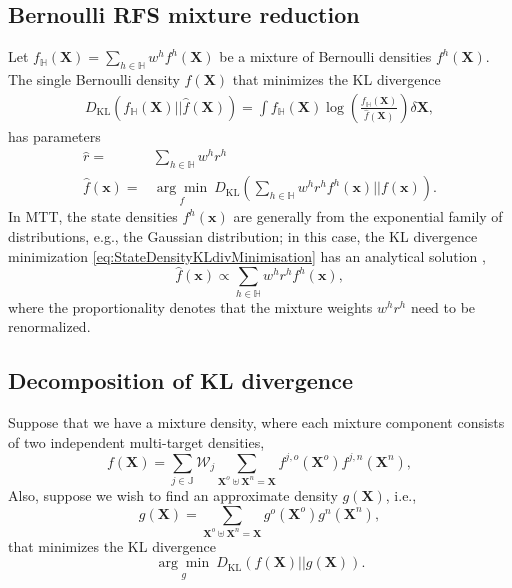\documentclass[journal]{IEEEtran}
\newcommand{\setX}{\mathbf{X}}
\newcommand{\sx}{\mathbf{x}}
\begin{document}
\subsection{Bernoulli RFS mixture reduction}
\label{sec:bmr}
Let $f_{\mathbb{H}}(\setX) = \sum_{h\in\mathbb{H}} w^{h} f^{h}(\setX)$ be a mixture of Bernoulli densities $f^{h}(\setX)$. The single Bernoulli density $\hat{f}(\setX)$ that minimizes the KL divergence
\begin{align}
    D_{\text{KL}}(f_{\mathbb{H}}(\setX) || \hat{f}(\setX) ) = \int f_{\mathbb{H}}(\setX) \log\left( \frac{f_{\mathbb{H}}(\setX)}{\hat{f}(\setX)} \right) \delta \setX,
\end{align}
has parameters \cite{pmbmpoint}
\begin{subequations}
\begin{align}
    \hat{r} = & \sum_{h\in\mathbb{H}} w^{h}r^{h} \\
    \hat{f}(\sx) = & \underset{f}{\arg\min}~D_{\text{KL}} \left(  \sum_{h\in\mathbb{H}} w^{h} r^{h} f^{h}(\sx)  || f(\sx) \right). \label{eq:StateDensityKLdivMinimisation}
\end{align}
\label{eq:approximatedBernoulli}
\end{subequations}
In MTT, the state densities $f^{h}(\sx)$ are generally from the exponential family of distributions, e.g., the Gaussian distribution; in this case, the KL divergence minimization \eqref{eq:StateDensityKLdivMinimisation} has an analytical solution \cite{ ArdeshiriGOO:2015},
\begin{equation}
    \hat{f}(\mathbf{x})\propto\sum_{h\in\mathbb{H}} w^{h} r^{h} f^{h}(\sx),
\end{equation}
where the proportionality denotes that the mixture weights $w^{h}r^{h}$ need to be renormalized.

\subsection{Decomposition of KL divergence}
\label{section:kldecomposition}
Suppose that we have a mixture density, where each mixture component consists of two independent multi-target densities,
\begin{equation}
    f(\setX) = \sum_{j\in\mathbb{J}} \mathcal{W}_j  \sum_{\setX^o \uplus \setX^n = \setX } f^{j,o}(\setX^o) f^{j,n} (\setX^n),
\end{equation}
Also, suppose we wish to find an approximate density $g(\mathbf{X})$, i.e.,
\begin{equation}
    g(\setX) = \sum_{\setX^o \uplus \setX^n = \setX } g^{o}(\setX^o) g^{n} (\setX^n),
\end{equation}
that minimizes the KL divergence
\begin{equation}
    \underset{g}{\arg\min}~D_{\text{KL}}(f(\mathbf{X})||g(\mathbf{X})).
    \label{eq:originalkl}
\end{equation}
\end{document}
